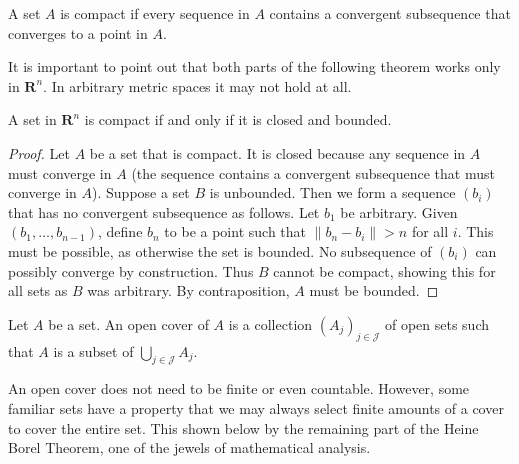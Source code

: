 \begin{definition}
  A set $A$ is compact if every sequence in $A$ contains a convergent subsequence that converges to a point in $A$.
\end{definition}

It is important to point out that both parts of the following theorem works only in $\mathbf{R}^n$. In arbitrary metric spaces it may not hold at all.

\begin{theorem}
  A set in $\mathbf{R}^n$ is compact if and only if it is closed and bounded.
\end{theorem}
\begin{proof}
  Let $A$ be a set that is compact. It is closed because any sequence in $A$ must converge in $A$ (the sequence contains a convergent subsequence that must converge in $A$). Suppose a set $B$ is unbounded. Then we form a sequence $(b_i)$ that has no convergent subsequence as follows. Let $b_1$ be arbitrary. Given $(b_1, \dots, b_{n-1})$, define $b_n$ to be a point such that $\| b_n - b_i \| > n$ for all $i$. This must be possible, as otherwise the set is bounded. No subsequence of $(b_i)$ can possibly converge by construction. Thus $B$ cannot be compact, showing this for all sets as $B$ was arbitrary. By contraposition, $A$ must be bounded.
\end{proof}

\begin{definition}
  Let $A$ be a set. An open cover of $A$ is a collection $(A_j)_{j \in \mathcal{J}}$ of open sets such that $A$ is a subset of $\bigcup_{j \in \mathcal{J}} A_j$.
\end{definition}

An open cover does not need to be finite or even countable. However, some familiar sets have a property that we may always select finite amounts of a cover to cover the entire set. This shown below by the remaining part of the Heine Borel Theorem, one of the jewels of mathematical analysis.

